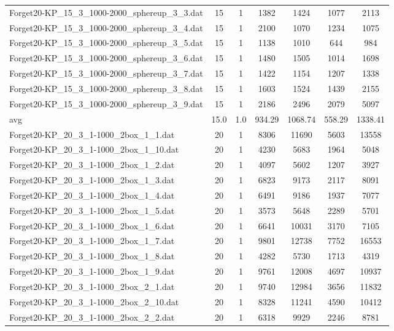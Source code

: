 \begin{table}[!ht]
\begin{tabular}{lcccccc}
Forget20-KP\_15\_3\_1000-2000\_sphereup\_3\_3.dat & 15 & 1 & 1382 & 1424 & 1077 & 2113 \\
Forget20-KP\_15\_3\_1000-2000\_sphereup\_3\_4.dat & 15 & 1 & 2100 & 1070 & 1234 & 1075 \\
Forget20-KP\_15\_3\_1000-2000\_sphereup\_3\_5.dat & 15 & 1 & 1138 & 1010 & 644 & 984 \\
Forget20-KP\_15\_3\_1000-2000\_sphereup\_3\_6.dat & 15 & 1 & 1480 & 1505 & 1014 & 1698 \\
Forget20-KP\_15\_3\_1000-2000\_sphereup\_3\_7.dat & 15 & 1 & 1422 & 1154 & 1207 & 1338 \\
Forget20-KP\_15\_3\_1000-2000\_sphereup\_3\_8.dat & 15 & 1 & 1603 & 1524 & 1439 & 2155 \\
Forget20-KP\_15\_3\_1000-2000\_sphereup\_3\_9.dat & 15 & 1 & 2186 & 2496 & 2079 & 5097 \\
\cline{1-9} avg & 15.0 & 1.0 & 934.29& 1068.74 & 558.29& 1338.41\\ \hline
Forget20-KP\_20\_3\_1-1000\_2box\_1\_1.dat & 20 & 1 & 8306 & 11690 & 5603 & 13558 \\
Forget20-KP\_20\_3\_1-1000\_2box\_1\_10.dat & 20 & 1 & 4230 & 5683 & 1964 & 5048 \\
Forget20-KP\_20\_3\_1-1000\_2box\_1\_2.dat & 20 & 1 & 4097 & 5602 & 1207 & 3927 \\
Forget20-KP\_20\_3\_1-1000\_2box\_1\_3.dat & 20 & 1 & 6823 & 9173 & 2117 & 8091 \\
Forget20-KP\_20\_3\_1-1000\_2box\_1\_4.dat & 20 & 1 & 6491 & 9186 & 1937 & 7077 \\
Forget20-KP\_20\_3\_1-1000\_2box\_1\_5.dat & 20 & 1 & 3573 & 5648 & 2289 & 5701 \\
Forget20-KP\_20\_3\_1-1000\_2box\_1\_6.dat & 20 & 1 & 6641 & 10031 & 3170 & 7105 \\
Forget20-KP\_20\_3\_1-1000\_2box\_1\_7.dat & 20 & 1 & 9801 & 12738 & 7752 & 16553 \\
Forget20-KP\_20\_3\_1-1000\_2box\_1\_8.dat & 20 & 1 & 4282 & 5730 & 1713 & 4319 \\
Forget20-KP\_20\_3\_1-1000\_2box\_1\_9.dat & 20 & 1 & 9761 & 12008 & 4697 & 10937 \\
Forget20-KP\_20\_3\_1-1000\_2box\_2\_1.dat & 20 & 1 & 9740 & 12984 & 3656 & 11832 \\
Forget20-KP\_20\_3\_1-1000\_2box\_2\_10.dat & 20 & 1 & 8328 & 11241 & 4590 & 10412 \\
Forget20-KP\_20\_3\_1-1000\_2box\_2\_2.dat & 20 & 1 & 6318 & 9929 & 2246 & 8781 \\

\end{tabular}
\end{table}
